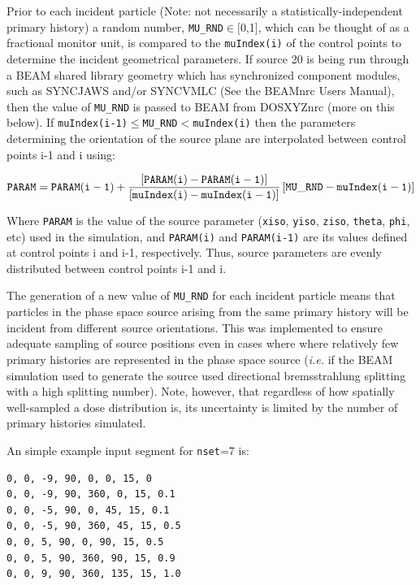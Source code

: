 \documentclass[12pt,twoside]{article}      %
\newcommand{\indexm}[1]{\index{#1}}
\begin{document}
\indexm{MU\_RND}
\indexm{Source 20!Example control point settings}
Prior to each incident particle (Note: not necessarily a statistically-independent primary history)
a random number, {\tt MU\_RND}$\in[$0,1$]$, which can be thought of as a fractional monitor unit, is compared to the {\tt muIndex(i)} of the control points
to determine the incident geometrical parameters.  If source 20 is being run through a BEAM shared library geometry which has
synchronized component modules, such as SYNCJAWS and/or SYNCVMLC (See the BEAMnrc Users Manual\cite{Ro09}), then
the value of {\tt MU\_RND} is passed to BEAM from DOSXYZnrc (more on this below).
If {\tt muIndex(i-1)}$\leq${\tt MU\_RND}$<${\tt muIndex(i)}
then the parameters determining the orientation of the source plane are interpolated
between control points i-1 and i using:

\begin{equation}
{\tt PARAM}={\tt PARAM(i-1)}+\frac{\left[{\tt PARAM(i)}-{\tt PARAM(i-1)}\right]}
{\left[{\tt muIndex(i)}-{\tt muIndex(i-1)}\right]}\left[{\tt MU\_RND}-{\tt muIndex(i-1)}\right]
\end{equation}

Where {\tt PARAM} is the value of the source parameter ({\tt xiso}, {\tt yiso}, {\tt ziso}, {\tt theta}, {\tt phi}, etc) used in the simulation, and {\tt PARAM(i)} and {\tt PARAM(i-1)} are its values defined at control points i and i-1, respectively.
Thus, source parameters are evenly distributed between control points i-1 and i.

The generation of a new value of {\tt MU\_RND} for each incident particle means that particles in the phase space source arising
from the same primary history will be incident from different source orientations.  This was implemented to ensure adequate sampling
of source positions even in cases where where relatively few primary histories are represented in the phase space source
({\it i.e.} if the BEAM simulation used to generate the source used directional bremsstrahlung splitting with a high
splitting number).  Note, however, that regardless of how spatially well-sampled a dose distribution is, its uncertainty is
limited by the number of primary histories simulated.

An simple example input segment for {\tt nset}=7 is:

\begin{verbatim}
0, 0, -9, 90, 0, 0, 15, 0
0, 0, -9, 90, 360, 0, 15, 0.1
0, 0, -5, 90, 0, 45, 15, 0.1
0, 0, -5, 90, 360, 45, 15, 0.5
0, 0, 5, 90, 0, 90, 15, 0.5
0, 0, 5, 90, 360, 90, 15, 0.9
0, 0, 9, 90, 360, 135, 15, 1.0
\end{verbatim}
\end{document}
